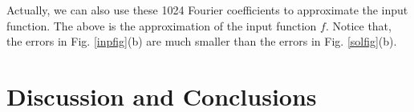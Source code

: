 \documentclass[graybox,footinfo]{svmult}
\newcommand{\DHJRnorm}[2][{}]{\ensuremath{\left \lVert #2 \right \rVert}_{#1}}
\newcommand{\DHJRabs}[1]{\ensuremath{{\left \lvert #1 \right \rvert}}}
\begin{document}
Actually, we can also use these 1024 Fourier coefficients to approximate the input function. The above is the approximation of the input function $f$. Notice that, the errors in Fig. \ref{inpfig}(b) are much smaller than the errors in Fig. \ref{solfig}(b). 


%
%

\section{Discussion and Conclusions} \label{sec:conc}



\end{document}
